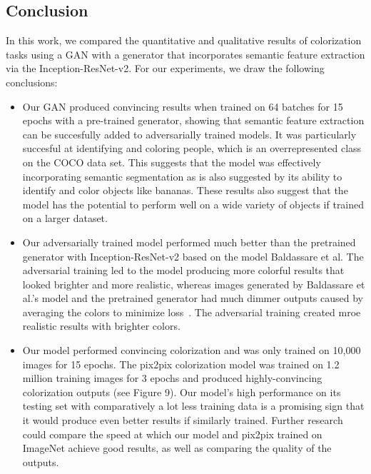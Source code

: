 \documentclass[10pt,twocolumn,letterpaper]{article}
\begin{document}
\subsection{Conclusion}
In this work, we compared the quantitative and qualitative results of colorization tasks using a GAN with a generator that incorporates semantic feature extraction via the Inception-ResNet-v2. For our experiments, we draw the following conclusions:
\begin{itemize}
    \item Our GAN produced convincing results when trained on 64 batches for 15 epochs with a pre-trained generator, showing that semantic feature extraction can be succesfully added to adversarially trained models.  It was particularly succesful at identifying and coloring people, which is an overrepresented class on the COCO data set. This suggests  that the model was effectively incorporating semantic segmentation as is also suggested by its ability to identify and color objects like bananas. These results also suggest that the model has the potential to perform well on a wide variety of objects if trained on a larger dataset. 
\end{itemize}
\begin{itemize}
    \item Our adversarially trained model performed much better than the pretrained generator with Inception-ResNet-v2 based on the model Baldassare et al. The adversarial training led to the model producing more colorful results that looked brighter and more realistic, whereas images generated by  Baldassare et al.'s model and the pretrained generator had much dimmer outputs caused by averaging the colors to minimize loss~\cite{Koalarization}. The adversarial training created mroe realistic results with brighter colors.
\end{itemize}
\begin{itemize}
    \item Our model performed convincing colorization and was only trained on 10,000 images for 15 epochs. The pix2pix colorization model was trained on 1.2 million training images for 3 epochs and produced highly-convincing colorization outputs (see Figure 9). Our model's high performance on its testing set with comparatively a lot less training data is a promising sign that it would produce even better results if similarly trained. Further research could compare the speed at which our model and  pix2pix trained on ImageNet achieve good results, as well as comparing the quality of the outputs.
\end{itemize}
\end{document}
